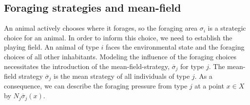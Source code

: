 \subsection{Foraging strategies and mean-field}
An animal actively chooses where it forages, so the foraging area $\sigma_i$ is a strategic choice for an animal. In order to inform this choice, we need to establish the playing field. An animal of type $i$ faces the environmental state and the foraging choices of all other inhabitants. Modeling the influence of the foraging choices necessitates the introduction of the mean-field-strategy, $\overbar{\sigma}_j$ for type $j$. The mean-field strategy $\overbar{\sigma}_j$ is the mean strategy of all individuals of type $j$. As a consequence, we can describe the foraging pressure from type $j$ at a point $x\in X$ by $N_j \overbar{\sigma}_j(x)$.


